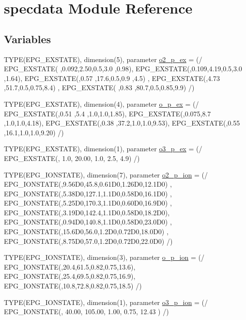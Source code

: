 \hypertarget{namespacespecdata}{
\section{specdata Module Reference}
\label{namespacespecdata}
}
\subsection*{Variables}
\begin{DoxyCompactItemize}
\item 
TYPE(EPG\_\-EXSTATE), dimension(5), parameter \hyperlink{namespacespecdata_ae681c0bc4ab2fa5470a5956b4bec78d0}{o2\_\-p\_\-ex} = (/ EPG\_\-EXSTATE( ,0.092,2.50,0.5,3.0 ,0.98), EPG\_\-EXSTATE(,0.109,4.19,0.5,3.0 ,1.64), EPG\_\-EXSTATE(,0.57 ,17.6,0.5,0.9 ,4.5) , EPG\_\-EXSTATE(,4.73 ,51.7,0.5,0.75,8.4) , EPG\_\-EXSTATE( ,0.83 ,80.7,0.5,0.85,9.9) /)
\item 
TYPE(EPG\_\-EXSTATE), dimension(4), parameter \hyperlink{namespacespecdata_ae83fc5fae3d6873e5453849a6289952f}{o\_\-p\_\-ex} = (/ EPG\_\-EXSTATE(,0.51 ,5.4 ,1.0,1.0,1.85), EPG\_\-EXSTATE(,0.075,8.7 ,1.0,1.0,4.18), EPG\_\-EXSTATE(,0.38 ,37.2,1.0,1.0,9.53), EPG\_\-EXSTATE(,0.55 ,16.1,1.0,1.0,9.20) /)
\item 
TYPE(EPG\_\-EXSTATE), dimension(1), parameter \hyperlink{namespacespecdata_a5715afaf9a7cd31ff6c899aec265dc7e}{o3\_\-p\_\-ex} = (/ EPG\_\-EXSTATE(, 1.0, 20.00, 1.0, 2.5, 4.9) /)
\item 
TYPE(EPG\_\-IONSTATE), dimension(7), parameter \hyperlink{namespacespecdata_a1de88d1ad1d0aa421deaf2c5ac887ed8}{o2\_\-p\_\-ion} = (/ EPG\_\-IONSTATE(,9.56D0,45.8,0.61D0,1.26D0,12.1D0) , EPG\_\-IONSTATE(,5.38D0,127.1,1.1D0,0.58D0,16.1D0) , EPG\_\-IONSTATE(,5.25D0,170.3,1.1D0,0.60D0,16.9D0) , EPG\_\-IONSTATE(,3.19D0,142.4,1.1D0,0.58D0,18.2D0), EPG\_\-IONSTATE(,0.94D0,140.8,1.1D0,0.58D0,23.0D0) , EPG\_\-IONSTATE(,15.6D0,56.0,1.2D0,0.72D0,18.0D0) , EPG\_\-IONSTATE(,8.75D0,57.0,1.2D0,0.72D0,22.0D0) /)
\item 
TYPE(EPG\_\-IONSTATE), dimension(3), parameter \hyperlink{namespacespecdata_a67659f2839588aff464762d181bccdd7}{o\_\-p\_\-ion} = (/ EPG\_\-IONSTATE(,20.4,61.5,0.82,0.75,13.6), EPG\_\-IONSTATE(,25.4,69.5,0.82,0.75,16.9), EPG\_\-IONSTATE(,10.8,72.8,0.82,0.75,18.5) /)
\item 
TYPE(EPG\_\-IONSTATE), dimension(1), parameter \hyperlink{namespacespecdata_a42d18c80256a5ca2ccebe8a3f4d451a0}{o3\_\-p\_\-ion} = (/ EPG\_\-IONSTATE(, 40.00, 105.00, 1.00, 0.75, 12.43 ) /)
\item 

\end{DoxyCompactItemize}
